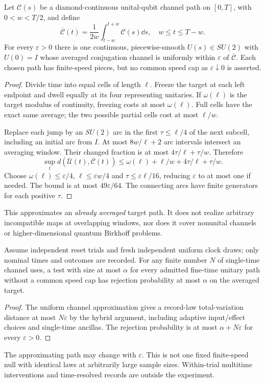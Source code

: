 \documentclass[11pt]{article}
\begin{document}
\begin{theorem}\label{thm:clock}
Let $\mathcal C(s)$ be a diamond-continuous unital-qubit channel path on
$[0,T]$, with $0<w<T/2$, and define
\[
 \overline{\mathcal C}(t)=\frac1{2w}
 \int_{t-w}^{t+w}\mathcal C(s)\dd s,\quad w\leq t\leq T-w.
\]
For every $\varepsilon>0$ there is one continuous, piecewise-smooth
$U(s)\in SU(2)$ with $U(0)=I$ whose averaged conjugation channel is
uniformly within $\varepsilon$ of $\overline{\mathcal C}$.
Each chosen path has finite-speed pieces, but no common speed cap as
$\varepsilon\downarrow0$ is asserted.
\end{theorem}
\begin{proof}
Divide time into equal cells of length $\ell$. Freeze the target at each
left endpoint and dwell equally at its four representing unitaries.
If $\omega(\ell)$ is the target modulus of continuity, freezing costs
at most $\omega(\ell)$. Full cells have the exact same average; the
two possible partial cells cost at most $\ell/w$.

Replace each jump by an $SU(2)$ arc in the first $\tau\leq\ell/4$ of the
next subcell, including an initial arc from $I$.
At most $8w/\ell+2$ arc intervals intersect an averaging window.
Their changed fraction is at most $4\tau/\ell+\tau/w$. Therefore
\[
 \sup_t d(\overline{\mathcal U}(t),\overline{\mathcal C}(t))
 \leq\omega(\ell)+\ell/w+4\tau/\ell+\tau/w .
\]
Choose $\omega(\ell)\leq\varepsilon/4$, $\ell\leq\varepsilon w/4$ and
$\tau\leq\varepsilon\ell/16$, reducing $\varepsilon$ to at most one if
needed. The bound is at most $49\varepsilon/64$.
The connecting arcs have finite generators for each positive $\tau$.
\end{proof}
This approximates an \emph{already averaged} target path. It does not
realize arbitrary incompatible maps at overlapping windows, nor does it
cover nonunital channels or higher-dimensional quantum Birkhoff problems.

\begin{corollary}
Assume independent reset trials and fresh independent uniform clock draws;
only nominal times and outcomes are recorded. For any finite number $N$ of
single-time channel uses, a test with size at most $\alpha$ for every
admitted fine-time unitary path without a common speed cap has rejection
probability at most $\alpha$ on the averaged target.
\end{corollary}
\begin{proof}
The uniform channel approximation gives a record-law total-variation
distance at most $N\varepsilon$ by the hybrid argument, including adaptive
input/effect choices and single-time ancillas. The rejection probability is
at most $\alpha+N\varepsilon$ for every $\varepsilon>0$.
\end{proof}
The approximating path may change with $\varepsilon$. This is not one fixed
finite-speed null with identical laws at arbitrarily large sample sizes.
Within-trial multitime interventions and time-resolved records are outside
the experiment.
\end{document}
